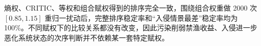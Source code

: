 熵权、CRITIC、等权和组合赋权得到的排序完全一致，围绕组合权重做 2000 次 $[0.85,1.15]$ 重归一扰动后，完整排序稳定率和“入侵情景最差”稳定率均为 100\%。不同赋权下的比较关系都没有改变，因此污染削弱禁渔收益、入侵进一步恶化系统状态的次序判断并不依赖某一套特定赋权。
